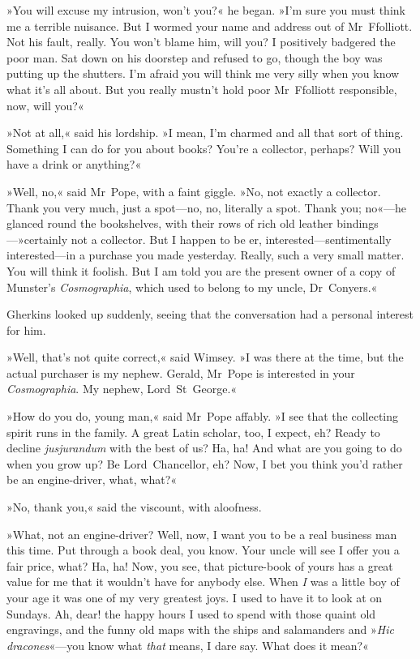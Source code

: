 »You will excuse my intrusion, won't you?« he began. »I'm sure you must think me a terrible nuisance. But I wormed your name and address out of Mr~Ffolliott. Not his fault, really. You won't blame him, will you? I positively badgered the poor man. Sat down on his doorstep and refused to go, though the boy was putting up the shutters. I'm afraid you will think me very silly when you know what it's all about. But you really mustn't hold poor Mr~Ffolliott responsible, now, will you?«

»Not at all,« said his lordship. »I mean, I'm charmed and all that sort of thing. Something I can do for you about books? You're a collector, perhaps? Will you have a drink or anything?«

»Well, no,« said Mr~Pope, with a faint giggle. »No, not exactly a collector. Thank you very much, just a spot—no, no, literally a spot. Thank you; no«—he glanced round the bookshelves, with their rows of rich old leather bindings—»certainly not a collector. But I happen to be er, interested—sentimentally interested—in a purchase you made yesterday. Really, such a very small matter. You will think it foolish. But I am told you are the present owner of a copy of Munster's \textit{Cosmographia}, which used to belong to my uncle, Dr~Conyers.«

Gherkins looked up suddenly, seeing that the conversation had a personal interest for him.

»Well, that's not quite correct,« said Wimsey. »I was there at the time, but the actual purchaser is my nephew. Gerald, Mr~Pope is interested in your \textit{Cosmographia}. My nephew, Lord~St~George.«

»How do you do, young man,« said Mr~Pope affably. »I see that the collecting spirit runs in the family. A great Latin scholar, too, I expect, eh? Ready to decline \textit{jusjurandum} with the best of us? Ha, ha! And what are you going to do when you grow up? Be Lord~Chancellor, eh? Now, I bet you think you'd rather be an engine-driver, what, what?«

»No, thank you,« said the viscount, with aloofness.

»What, not an engine-driver? Well, now, I want you to be a real business man this time. Put through a book deal, you know. Your uncle will see I offer you a fair price, what? Ha, ha! Now, you see, that picture-book of yours has a great value for me that it wouldn't have for anybody else. When \textit{I} was a little boy of your age it was one of my very greatest joys. I used to have it to look at on Sundays. Ah, dear! the happy hours I used to spend with those quaint old engravings, and the funny old maps with the ships and salamanders and »\textit{Hic dracones}«—you know what \textit{that} means, I dare say. What does it mean?«

